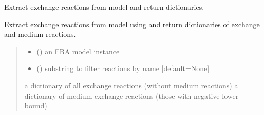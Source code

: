 \documentclass[letterpaper,12pt,english]{sphinxmanual}
\begin{document}

\begin{fulllineitems}
\label{\detokenize{api/core:cbmpy.CBTools.processExchangeReactions}}
\pysigstartsignatures
\pysiglinewithargsret
{}
{\sphinxparamcomma {}}
{}
\pysigstopsignatures
\sphinxAtStartPar
Extract exchange reactions from model and return dictionaries.

\sphinxAtStartPar
Extract exchange reactions from model using  and return dictionaries
of exchange and medium reactions.
\begin{quote}\begin{description}
\begin{itemize}
\item {} 
\sphinxAtStartPar
{} () \textendash{} an FBA model instance

\item {} 
\sphinxAtStartPar
{} (\sphinxstyleliteralemphasis{\sphinxupquote{, }}) \textendash{} substring to filter reactions by name {[}default=None{]}

\end{itemize}

\sphinxAtStartPar
{} \textendash{} a dictionary of all exchange reactions (without medium reactions)
a dictionary of medium exchange reactions (those with negative lower bound)

\end{description}\end{quote}

\end{fulllineitems}

\end{document}
